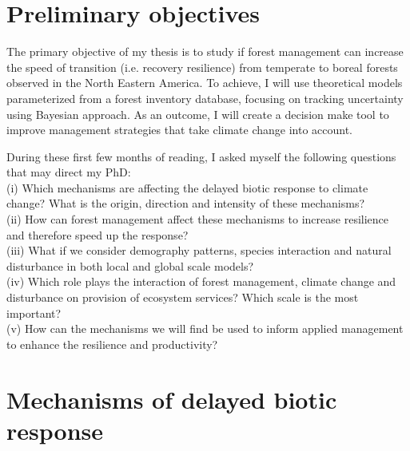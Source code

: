 
\section{Preliminary objectives}\label{obj}

The primary objective of my thesis is to study if forest management can increase the speed of transition (i.e. recovery resilience) from temperate to boreal forests observed in the North Eastern America.
To achieve, I will use theoretical models parameterized from a forest inventory database, focusing on tracking uncertainty using Bayesian approach.
As an outcome, I will create a decision make tool to improve management strategies that take climate change into account.

During these first few months of reading, I asked myself the following questions that may direct my PhD: \\
(i) Which mechanisms are affecting the delayed biotic response to climate change? What is the origin, direction and intensity of these mechanisms? \\
(ii) How can forest management affect these mechanisms to increase resilience and therefore speed up the response? \\
(iii) What if we consider demography patterns, species interaction and natural disturbance in both local and global scale models? \\
(iv) Which role plays the interaction of forest management, climate change and disturbance on provision of ecosystem services? Which scale is the most important? \\
(v) How can the mechanisms we will find be used to inform applied management to enhance the resilience and productivity?

\section{Mechanisms of delayed biotic response}

